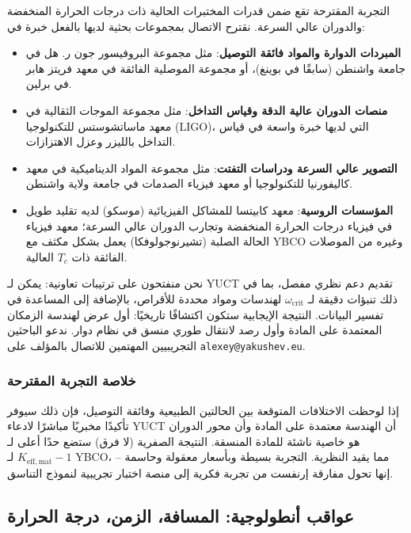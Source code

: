 \documentclass[12pt,a4paper]{article}
\begin{document}
	التجربة المقترحة تقع ضمن قدرات المختبرات الحالية ذات درجات الحرارة المنخفضة والدوران عالي السرعة. نقترح الاتصال بمجموعات بحثية لديها بالفعل خبرة في:
	\begin{itemize}
		\item \textbf{المبردات الدوارة والمواد فائقة التوصيل}: مثل مجموعة البروفيسور جون ر. هل في جامعة واشنطن (سابقًا في بوينغ)، أو مجموعة الموصلية الفائقة في معهد فريتز هابر في برلين.
		\item \textbf{منصات الدوران عالية الدقة وقياس التداخل}: مثل مجموعة الموجات الثقالية في معهد ماساتشوستس للتكنولوجيا (LIGO)، التي لديها خبرة واسعة في قياس التداخل بالليزر وعزل الاهتزازات.
		\item \textbf{التصوير عالي السرعة ودراسات التفتت}: مثل مجموعة المواد الديناميكية في معهد كاليفورنيا للتكنولوجيا أو معهد فيزياء الصدمات في جامعة ولاية واشنطن.
		\item \textbf{المؤسسات الروسية}: معهد كابيتسا للمشاكل الفيزيائية (موسكو) لديه تقليد طويل في فيزياء درجات الحرارة المنخفضة وتجارب الدوران عالي السرعة؛ معهد فيزياء الحالة الصلبة (تشيرنوجولوفكا) يعمل بشكل مكثف مع YBCO وغيره من الموصلات الفائقة ذات \(T_c\) العالية.
	\end{itemize}
	
	نحن منفتحون على ترتيبات تعاونية: يمكن لـ YUCT تقديم دعم نظري مفصل، بما في ذلك تنبؤات دقيقة لـ \(\omega_{\text{crit}}\) لهندسات ومواد محددة للأقراص، بالإضافة إلى المساعدة في تفسير البيانات. النتيجة الإيجابية ستكون اكتشافًا تاريخيًا: أول عرض لهندسة الزمكان المعتمدة على المادة وأول رصد لانتقال طوري منسق في نظام دوار. ندعو الباحثين التجريبيين المهتمين للاتصال بالمؤلف على \texttt{alexey@yakushev.eu}.
	
	\subsubsection{خلاصة التجربة المقترحة}
	
	إذا لوحظت الاختلافات المتوقعة بين الحالتين الطبيعية وفائقة التوصيل، فإن ذلك سيوفر تأكيدًا مخبريًا مباشرًا لادعاء YUCT أن الهندسة معتمدة على المادة وأن محور الدوران هو خاصية ناشئة للمادة المنسقة. النتيجة الصفرية (لا فرق) ستضع حدًا أعلى لـ \(K_{\mathrm{eff,mat}} - 1\) لـ YBCO، مما يقيد النظرية. التجربة بسيطة وبأسعار معقولة وحاسمة – إنها تحول مفارقة إرنفست من تجربة فكرية إلى منصة اختبار تجريبية لنموذج التناسق.
	
	\subsection{عواقب أنطولوجية: المسافة، الزمن، درجة الحرارة}
	
\end{document}
